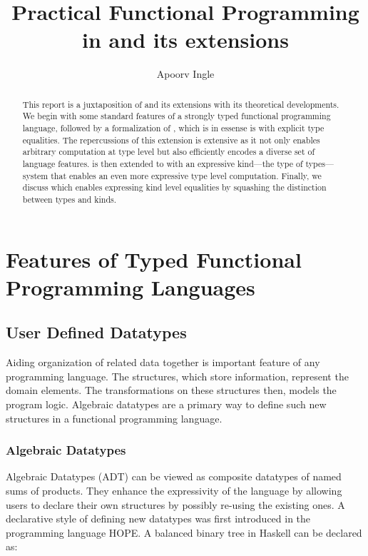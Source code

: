 \documentclass[manuscript,screen,nonacm]{acmart}
\title{Practical Functional Programming in \SFC and its extensions}
\author{Apoorv Ingle}
\affiliation{%
  \institution{University of Iowa}
  \department{Department of Computer Science}
  \streetaddress{McLean Hall}
  \city{Iowa City}
  \state{Iowa}
  \country{USA}}
\begin{document}
\begin{abstract}
  This report is a juxtaposition of \SFC and its extensions with its theoretical developments. We begin with some standard features of a strongly typed functional programming language, followed by a formalization of \SFC, which is in essense is \SF with explicit type equalities. The repercussions of this extension is extensive as it not only enables arbitrary computation at type level but also efficiently encodes a diverse set of language features. \SFC is then extended to \SFP with an expressive kind---the type of types---system that enables an even more expressive type level computation. Finally, we discuss \SFK which enables expressing kind level equalities by squashing the distinction between types and kinds.
\end{abstract}

\maketitle
\pagestyle{plain}

\section{Features of Typed Functional Programming Languages}\label{sec:language-features}
\subsection{User Defined Datatypes}
Aiding organization of related data together is important feature of any programming language. The structures, which store information, represent the domain elements. The transformations on these structures then, models the program logic. Algebraic datatypes are a primary way to define such new structures in a functional programming language.

\subsubsection{Algebraic Datatypes}
Algebraic Datatypes (ADT) can be viewed as composite datatypes of named sums of products. They enhance the expressivity of the language by allowing users to declare their own structures by possibly re-using the existing ones. A declarative style of defining new datatypes was first introduced in the programming language HOPE\cite{burstall_hope_1980}. A balanced binary tree in Haskell can be declared as:
\end{document}
